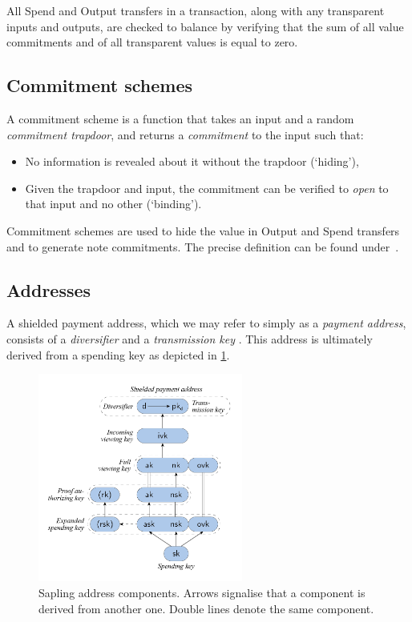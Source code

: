 All Spend and Output transfers in a transaction, along with any transparent inputs and outputs, are checked to balance by verifying that the sum of all value commitments and of all transparent values is equal to zero.

\subsection{Commitment schemes}

A commitment scheme is a function that takes an input and a random \emph{commitment trapdoor}, and returns a \emph{commitment} to the input such that:
\begin{itemize}
    \item No information is revealed about it without the trapdoor (`hiding'),
    \item Given the trapdoor and input, the commitment can be verified to \emph{open} to that input and no other (`binding').
\end{itemize}

Commitment schemes are used to hide the value in Output and Spend transfers and to generate note commitments.
The precise definition can be found under~\cite[4.1.7]{hopwood2016zcash}.

\subsection{Addresses}\label{sec:zcash_addr}

A shielded payment address, which we may refer to simply as a \emph{payment address}, consists of a \emph{diversifier} \dvf and a \emph{transmission key} \pkd. 
This address is ultimately derived from a spending key as depicted in \cref{fig:zcash_addr}.

\begin{figure}
\centering
\includegraphics[width=0.6\textwidth]{img/zcash_addresses.png}
\caption[Sapling address components]{Sapling address components. Arrows signalise that a component is derived from another one. Double lines denote the same component.}\label{fig:zcash_addr}
\end{figure}

